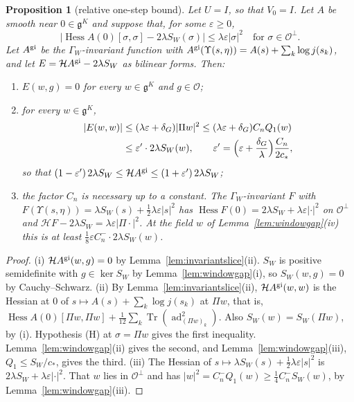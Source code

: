 \documentclass[11pt]{amsart}
\newtheorem{proposition}[theorem]{Proposition}
\theoremstyle{definition}
\theoremstyle{remark}
\numberwithin{equation}{section}
\newcommand{\g}{\mathfrak{g}}
\newcommand{\Tr}{\operatorname{Tr}}
\newcommand{\Hess}{\operatorname{Hess}}
\begin{document}
\begin{proposition}[relative one-step bound]\label{prop:relstep}
Let $U=I$, so that $V_0=I$. Let $A$ be smooth near $0\in\g^K$ and suppose
that, for some $\varepsilon\ge0$,
\[
\bigl\lvert\Hess A(0)[\sigma,\sigma]-2\lambda S_W(\sigma)\bigr\rvert\le
\lambda\varepsilon|\sigma|^2\quad\text{for }\sigma\in\mathcal O^\perp.
\tag{H}
\]
Let $A^{\rm gi}$ be the $\Gamma_W$-invariant function with $A^{\rm gi}
(\Upsilon(s,\eta))=A(s)+\sum_k\log j(s_k)$, and let $E=\mathcal HA^{\rm gi}-
2\lambda S_W$ as bilinear forms. Then:
\begin{enumerate}[label=\textup{(\roman*)},leftmargin=*]
\item $E(w,g)=0$ for every $w\in\g^K$ and $g\in\mathcal O$;
\item for every $w\in\g^K$,
\[
\begin{split}
\lvert E(w,w)\rvert&\le(\lambda\varepsilon+\delta_G)|\Pi w|^2\le
(\lambda\varepsilon+\delta_G)C_nQ_1(w)\\
&\le\varepsilon'\cdot2\lambda S_W(w),\qquad\varepsilon'=\Bigl(\varepsilon+
\frac{\delta_G}\lambda\Bigr)\frac{C_n}{2c_*},
\end{split}
\]
so that $(1-\varepsilon')\,2\lambda S_W\le\mathcal HA^{\rm gi}\le(1+
\varepsilon')\,2\lambda S_W$;
\item the factor $C_n$ is necessary up to a constant. The
$\Gamma_W$-invariant $F$ with $F(\Upsilon(s,\eta))=\lambda S_W(s)+\frac12
\lambda\varepsilon|s|^2$ has $\Hess F(0)=2\lambda S_W+\lambda\varepsilon
|\cdot|^2$ on $\mathcal O^\perp$ and $\mathcal HF-2\lambda S_W=\lambda
\varepsilon|\Pi\cdot|^2$. At the field $w$ of
Lemma~\ref{lem:windowgap}\textup{(iv)} this is at least $\frac18
\varepsilon C_n^-\cdot2\lambda S_W(w)$.
\end{enumerate}
\end{proposition}

\begin{proof}
(i) $\mathcal HA^{\rm gi}(w,g)=0$ by Lemma~\ref{lem:invariantslice}(ii).
$S_W$ is positive semidefinite with $g\in\ker S_W$ by
Lemma~\ref{lem:windowgap}(i), so $S_W(w,g)=0$ by Cauchy--Schwarz.
(ii) By Lemma~\ref{lem:invariantslice}(ii), $\mathcal HA^{\rm gi}(w,w)$ is the
Hessian at $0$ of $s\mapsto A(s)+\sum_k\log j(s_k)$ at $\Pi w$, that is,
$\Hess A(0)[\Pi w,\Pi w]+\frac1{12}\sum_k\Tr(\operatorname{ad}_{(\Pi w)_k}
^2)$. Also $S_W(w)=S_W(\Pi w)$, by (i). Hypothesis (H) at $\sigma=\Pi w$
gives the first inequality. Lemma~\ref{lem:windowgap}(ii) gives the second,
and Lemma~\ref{lem:windowgap}(iii), $Q_1\le S_W/c_*$, gives the third.
(iii) The Hessian of $s\mapsto\lambda S_W(s)+\frac12\lambda\varepsilon|s|^
2$ is $2\lambda S_W+\lambda\varepsilon|\cdot|^2$. That $w$ lies in
$\mathcal O^\perp$ and has $|w|^2=C_n^-Q_1(w)\ge\frac14C_n^-S_W(w)$, by
Lemma~\ref{lem:windowgap}(iii).
\end{proof}
\end{document}
